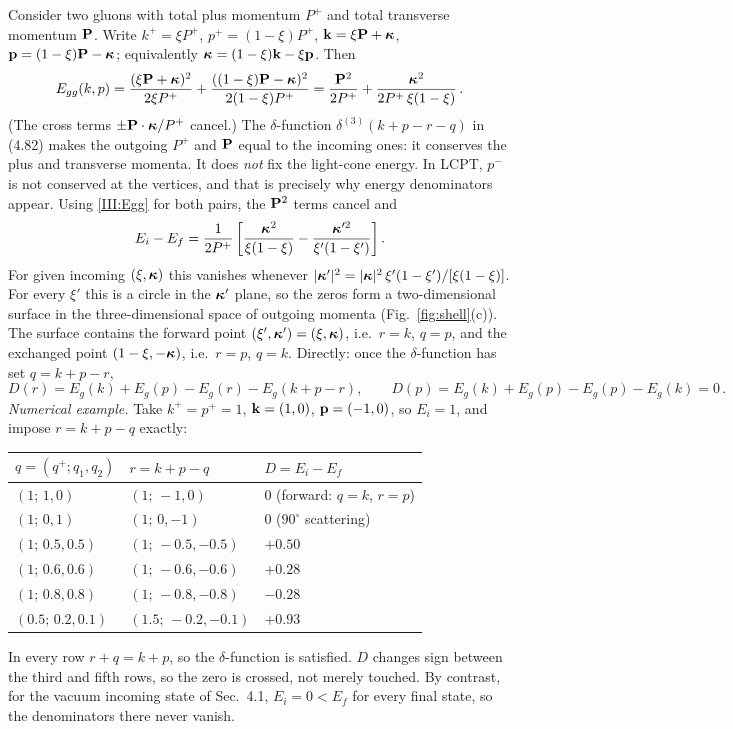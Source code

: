 Consider two gluons with total plus momentum $P^+$ and total transverse momentum $\mathbf P$. Write $k^+=\xi P^+$, $p^+=(1-\xi)P^+$, $\mathbf{k}=\xi\mathbf P+\boldsymbol\kappa$, $\mathbf{p}=(1-\xi)\mathbf P-\boldsymbol\kappa$; equivalently $\boldsymbol\kappa=(1-\xi)\mathbf{k}-\xi\mathbf{p}$. Then
\begin{equation}
E_{gg}(k,p)=\frac{(\xi\mathbf P+\boldsymbol\kappa)^2}{2\xi P^+}+\frac{((1-\xi)\mathbf P-\boldsymbol\kappa)^2}{2(1-\xi)P^+}=\frac{\mathbf P^2}{2P^+}+\frac{\boldsymbol\kappa^2}{2P^+\,\xi(1-\xi)}\,.
\label{III:Egg}
\end{equation}
(The cross terms $\pm\mathbf P\cdot\boldsymbol\kappa/P^+$ cancel.) The $\delta$-function $\delta^{(3)}(k+p-r-q)$ in (4.82) makes the outgoing $P^+$ and $\mathbf P$ equal to the incoming ones: it conserves the plus and transverse momenta. It does \emph{not} fix the light-cone energy. In LCPT, $p^-$ is not conserved at the vertices, and that is precisely why energy denominators appear. Using \eqref{III:Egg} for both pairs, the $\mathbf P^2$ terms cancel and
\begin{equation}
E_i-E_f=\frac{1}{2P^+}\left[\frac{\boldsymbol\kappa^2}{\xi(1-\xi)}-\frac{\boldsymbol\kappa'^2}{\xi'(1-\xi')}\right].
\label{III:shell}
\end{equation}
For given incoming $(\xi,\boldsymbol\kappa)$ this vanishes whenever $|\boldsymbol\kappa'|^2=|\boldsymbol\kappa|^2\,\xi'(1-\xi')/[\xi(1-\xi)]$. For every $\xi'$ this is a circle in the $\boldsymbol\kappa'$ plane, so the zeros form a two-dimensional surface in the three-dimensional space of outgoing momenta (Fig.~\ref{fig:shell}(c)). The surface contains the forward point $(\xi',\boldsymbol\kappa')=(\xi,\boldsymbol\kappa)$, i.e.\ $r=k$, $q=p$, and the exchanged point $(1-\xi,-\boldsymbol\kappa)$, i.e.\ $r=p$, $q=k$. Directly: once the $\delta$-function has set $q=k+p-r$,
\[
D(r)=E_g(k)+E_g(p)-E_g(r)-E_g(k+p-r),\qquad D(p)=E_g(k)+E_g(p)-E_g(p)-E_g(k)=0\,.
\]
\emph{Numerical example.} Take $k^+=p^+=1$, $\mathbf{k}=(1,0)$, $\mathbf{p}=(-1,0)$, so $E_i=1$, and impose $r=k+p-q$ exactly:
\begin{center}
\small
\begin{tabular}{lll}
\toprule
$q=(q^+;q_1,q_2)$ & $r=k+p-q$ & $D=E_i-E_f$\\
\midrule
$(1;\,1,0)$ & $(1;\,-1,0)$ & $0$ \quad (forward: $q=k$, $r=p$)\\
$(1;\,0,1)$ & $(1;\,0,-1)$ & $0$ \quad ($90^\circ$ scattering)\\
$(1;\,0.5,0.5)$ & $(1;\,-0.5,-0.5)$ & $+0.50$\\
$(1;\,0.6,0.6)$ & $(1;\,-0.6,-0.6)$ & $+0.28$\\
$(1;\,0.8,0.8)$ & $(1;\,-0.8,-0.8)$ & $-0.28$\\
$(0.5;\,0.2,0.1)$ & $(1.5;\,-0.2,-0.1)$ & $+0.93$\\
\bottomrule
\end{tabular}
\end{center}
In every row $r+q=k+p$, so the $\delta$-function is satisfied. $D$ changes sign between the third and fifth rows, so the zero is crossed, not merely touched. By contrast, for the vacuum incoming state of Sec.~4.1, $E_i=0<E_f$ for every final state, so the denominators there never vanish.

